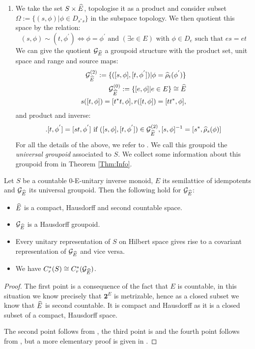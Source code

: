 \begin{definition}
\begin{enumerate}
\item We take the set $S \times \widehat{E}$, topologise it as a product and consider subset $\Omega:= \lbrace (s, \phi) | \phi \in D_{s^{*}s} \rbrace$ in the subspace topology. We then quotient this space by the relation:
\begin{equation*}
(s, \phi) \sim (t, \phi^{'}) \Leftrightarrow \phi=\phi^{'} \mbox{ and } (\exists e \in E) \mbox{ with } \phi \in D_{e} \mbox{ such that } es=et
\end{equation*}
We can give the quotient $\mathcal{G}_{\widehat{E}}$ a groupoid structure with the product set, unit space and range and source maps:
\begin{eqnarray*}
\mathcal{G}_{\widehat{E}}^{(2)}:=\lbrace ([s,\phi],[t,\phi^{'}]) | \phi=\widehat{\rho}_{t}(\phi^{'}) \rbrace \\
\mathcal{G}_{\widehat{E}}^{(0)}:= \lbrace [e,\phi] | e \in E \rbrace \cong \widehat{E} \\
s([t,\phi])=[t^{*}t,\phi], r([t,\phi])=[tt^{*},\phi], 
\end{eqnarray*}
and product and inverse:
\begin{eqnarray*}
[s,\phi].[t,\phi^{'}]= [st,\phi^{'}] \mbox{ if } ([s,\phi],[t,\phi^{'}]) \in \G_{\E}^{(2)}, [s,\phi]^{-1} = [s^{*},\widehat{\rho}_{s}(\phi)] 
\end{eqnarray*}
For all the details of the above, we refer to \cite[Section 4]{MR2419901}. We call this groupoid the \textit{universal groupoid} associated to $S$. We collect some information about this groupoid from \cite{MR2419901,MR1724106} in Theorem \ref{Thm:Info}.
\end{enumerate}
\end{definition}

\begin{theorem}\label{Thm:Info}
Let $S$ be a countable 0-E-unitary inverse monoid, $E$ its semilattice of idempotents and $\mathcal{G}_{\widehat{E}}$ its universal groupoid. Then the following hold for $\mathcal{G}_{\widehat{E}}$:
\begin{itemize}
\item $\widehat{E}$ is a compact, Hausdorff and second countable space.
\item $\mathcal{G}_{\widehat{E}}$ is a Hausdorff groupoid.
\item Every unitary representation of $S$ on Hilbert space gives rise to a covariant representation of $\mathcal{G}_{\widehat{E}}$ and vice versa.
\item We have $C^{*}_{r}(S) \cong C^{*}_{r}(\mathcal{G}_{\widehat{E}})$.
\end{itemize}
\end{theorem}
\begin{proof}
The first point is a consequence of the fact that $E$ is countable, in this situation we know precisely that $\textbf{2}^{E}$ is metrizable, hence as a closed subset we know that $\widehat{E}$ is second countable. It is compact and Hausdorff as it is a closed subset of a compact, Hausdorff space.

The second point follows from \cite[Corollary 10.9]{MR2419901}, the third point is \cite[Corollary 10.16]{MR2419901} and the fourth point follows from \cite[Theorem ...]{MR1724106}, but a more elementary proof is given in \cite{MR1900993}.
\end{proof}


